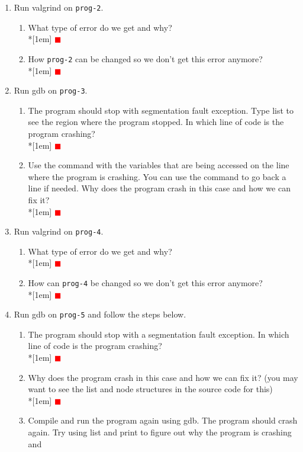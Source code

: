\documentclass[12pt]{article}
\newcommand{\TODO}{\textcolor{red}{$\blacksquare$}}
\begin{document}
\begin{enumerate}
\item Run valgrind on \texttt{prog-2}.
\begin{enumerate}
\item What type of error do we get and why?\\*[1em]
  \TODO
\item How \texttt{prog-2} can be changed so we don't get this error anymore?\\*[1em]
  \TODO
\end{enumerate}
\item Run gdb on \texttt{prog-3}.
\begin{enumerate}
\item The program should stop with segmentation fault exception. Type list to
  see the region where the program stopped. In which line of code is the program
  crashing?\\*[1em]
  \TODO
\item Use the command  with the variables that are
  being accessed on the line where the program is crashing. You can use the  command to go back a line if needed. Why does the program
  crash in this case and how we can fix it?\\*[1em]
  \TODO
\end{enumerate}
\item Run valgrind on \texttt{prog-4}.
\begin{enumerate}
\item What type of error do we get and why?\\*[1em]
  \TODO
\item How can \texttt{prog-4} be changed so we don't get this error anymore?\\*[1em]
  \TODO
\end{enumerate}
\item Run gdb on \texttt{prog-5} and follow the steps below.
\begin{enumerate}
\item The program should stop with a segmentation fault exception. In which line
  of code is the program crashing?\\*[1em]
  \TODO
\item Why does the program crash in this case and how we can fix it? (you may want
  to see the list and node structures in the source code for this)\\*[1em]
  \TODO
\item Compile and run the program again using gdb. The program should crash
  again. Try using list and print to figure out why the program is crashing and

\end{enumerate}
\end{enumerate}
\end{document}
